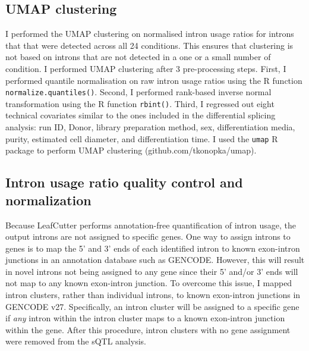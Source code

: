 \subsection{UMAP clustering}
I performed the UMAP clustering on normalised intron usage ratios for introns that that were detected across all 24 conditions. This ensures that clustering is not based on introns that are not detected in a one or a small number of condition. I performed UMAP clustering after 3 pre-processing steps. First, I performed quantile normalisation on raw intron usage ratios using the R function \Verb+normalize.quantiles()+. Second, I performed rank-based inverse normal transformation using the R function \Verb+rbint()+. Third, I regressed out eight technical covariates similar to the ones included in the differential splicing analysis: run ID, Donor, library preparation method, sex, differentiation media, purity, estimated cell diameter, and differentiation time. I used the \Verb+umap+ R package to perform UMAP clustering \cite{McInnes2018-fe} (github.com/tkonopka/umap). 

\subsection{Intron usage ratio quality control and normalization}
\label{sec:intron_qc_methods}
Because LeafCutter performs annotation-free quantification of intron usage, the output introns are not assigned to specific genes. One way to assign introns to genes is to map the 5' and 3' ends of each identified intron to known exon-intron junctions in an annotation database such as GENCODE. However, this will result in novel introns not being assigned to any gene since their 5' and/or 3' ends will not map to any known exon-intron junction. To overcome this issue, I mapped intron clusters, rather than individual introns, to known exon-intron junctions in GENCODE v27. Specifically, an intron cluster will be assigned to a specific gene if \textit{any} intron within the intron cluster maps to a known exon-intron junction within the gene. After this procedure, intron clusters with no gene assignment were removed from the sQTL analysis. 

